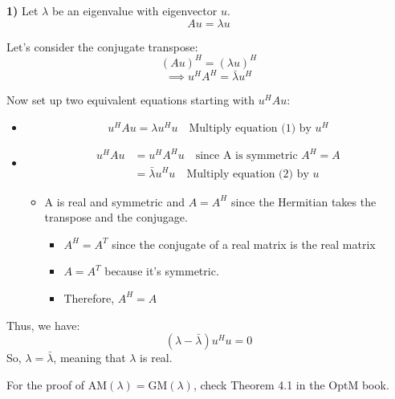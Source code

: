 \begin{derivation}
        \textbf{1)} Let $\lambda$ be an eigenvalue with eigenvector $u$.
        \[
        A u = \lambda u \tag{1}
        \]
        
        Let's consider the conjugate transpose:
        \[
        (A u)^H = (\lambda u)^H
        \]
        \[
        \implies u^H A^H = \bar{\lambda} u^H \tag{2}
        \]
        \vspace{1em}

        Now set up two equivalent equations starting with $u^H A u$:
        
        \begin{itemize}
            \item
            \[
            u^H A u = \lambda u^H u \quad \text{Multiply equation (1) by $u^H$}
            \]
            \item 
            \begin{align*}
                u^H A u &= u^H A^H u \quad \text{since A is symmetric } A^H = A\\
                &= \bar{\lambda} u^H u \quad \text{Multiply equation (2) by $u$}
            \end{align*}
            \begin{itemize}
                \item A is real and symmetric and $A = A^H$ since the Hermitian takes the transpose and the conjugage. 
                \begin{itemize}
                    \item $A^H = A^T$ since the conjugate of a real matrix is the real matrix 
                    \item $A=A^T$ because it's symmetric. 
                    \item Therefore, $A^H = A$
                \end{itemize}
            \end{itemize}
        \end{itemize}
        \vspace{1em}

        Thus, we have:
        \[
        (\lambda - \bar{\lambda}) u^H u = 0
        \]
        So, $\lambda = \bar{\lambda}$, meaning that $\lambda$ is real.
        \vspace{1em}

        For the proof of $\text{AM}(\lambda) = \text{GM}(\lambda)$, check Theorem 4.1 in the OptM book.
\end{derivation}

